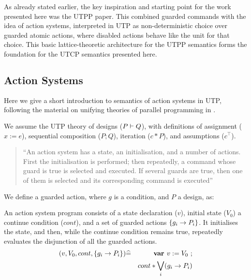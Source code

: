 As already stated earlier,
the key inspiration and starting point for the work presented here
was the UTPP paper\cite{DBLP:conf/icfem/WoodcockH02}.
This combined guarded commands\cite{1976:book:dijkstra}
with the idea of action systems\cite{PODC::BackK1983},
interpreted in UTP as non-deterministic choice
over guarded atomic actions,
where disabled actions behave like the unit for that choice.
This basic lattice-theoretic architecture for the UTPP semantics
forms the foundation for the UTCP semantics presented here.

\subsection{Action Systems}

Here we give a short introduction to semantics of action systems
in UTP, following the material on unifying theories
of parallel programming in \cite{DBLP:conf/icfem/WoodcockH02}.

We assume the UTP theory of designs ($P \vdash Q$), with definitions
of assignment ($x:=e$),
sequential composition ($P;Q$),
iteration ($c*P$), and assumptions ($c^\top$).

\begin{quote}
``An action system has a state, an initialisation, and a number of actions.
First the initialisation is performed;
then repeatedly, a command whose guard is true is selected and executed.
If several guards are true,
then one of them is selected and its corresponding command is executed''\cite{DBLP:conf/icfem/WoodcockH02}
\end{quote}



We define a guarded action, where $g$ is a condition,
and $P$ a design, as:

An action system program
consists of a state declaration ($v$),
initial state ($V_0$)
a continue condition ($cont$),
and a set of guarded actions $\{g_i \rightarrow P_i\}$.
It initialises the state,
and then, while the continue condition remains true,
repeatedly evaluates the disjunction of all the guarded actions.
\begin{eqnarray*}
(v,V_0,cont,\{g_i \rightarrow P_i\})
   &\widehat=&
   \textbf{var }v := V_0 ~;
\\&& cont * \bigvee_i (g_i \rightarrow P_i)
\end{eqnarray*}
